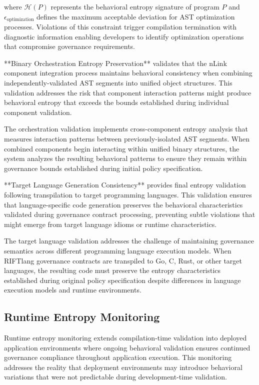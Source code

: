 where $\mathcal{H}(P)$ represents the behavioral entropy signature of program $P$ and $\epsilon_{\text{optimization}}$ defines the maximum acceptable deviation for AST optimization processes. Violations of this constraint trigger compilation termination with diagnostic information enabling developers to identify optimization operations that compromise governance requirements.

**Binary Orchestration Entropy Preservation** validates that the nLink component integration process maintains behavioral consistency when combining independently-validated AST segments into unified object structures. This validation addresses the risk that component interaction patterns might produce behavioral entropy that exceeds the bounds established during individual component validation.

The orchestration validation implements cross-component entropy analysis that measures interaction patterns between previously-isolated AST segments. When combined components begin interacting within unified binary structures, the system analyzes the resulting behavioral patterns to ensure they remain within governance bounds established during initial policy specification.

**Target Language Generation Consistency** provides final entropy validation following transpilation to target programming languages. This validation ensures that language-specific code generation preserves the behavioral characteristics validated during governance contract processing, preventing subtle violations that might emerge from target language idioms or runtime characteristics.

The target language validation addresses the challenge of maintaining governance semantics across different programming language execution models. When RIFTlang governance contracts are transpiled to Go, C, Rust, or other target languages, the resulting code must preserve the entropy characteristics established during original policy specification despite differences in language execution models and runtime environments.

\subsection{Runtime Entropy Monitoring}

Runtime entropy monitoring extends compilation-time validation into deployed application environments where ongoing behavioral validation ensures continued governance compliance throughout application execution. This monitoring addresses the reality that deployment environments may introduce behavioral variations that were not predictable during development-time validation.

